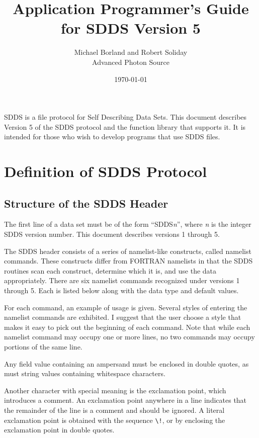 \documentclass[11pt]{article}
\begin{document}
\title{Application Programmer's Guide for SDDS Version 5}
\author{Michael Borland and Robert Soliday\\Advanced Photon Source\\ \date{\today}}
\maketitle

SDDS is a file protocol for Self Describing Data Sets. This document describes Version 5 of the SDDS protocol and the function library that supports it. It is intended for those who wish to develop programs that use SDDS files.

\section{Definition of SDDS Protocol}

\subsection{Structure of the SDDS Header}
\label{sect:header}

The first line of a data set must be of the form ``SDDS{\em n}'', where {\em n} is the integer SDDS version number. This document describes versions 1 through 5.

The SDDS header consists of a series of namelist-like constructs, called namelist commands.  These constructs differ from FORTRAN namelists in that the SDDS routines scan each construct, determine which it is, and use the data appropriately. There are six namelist commands recognized under versions 1 through 5.  Each is listed below along with the data type and default values.

For each command, an example of usage is given.  Several styles of entering the namelist commands are exhibited.  I suggest that the user choose a style that makes it easy to pick out the beginning of each command.  Note that while each namelist command may occupy one or more lines, no two commands may occupy portions of the same line.

Any field value containing an ampersand must be enclosed in double quotes, as must string values containing whitespace characters.

Another character with special meaning is the exclamation point, which introduces a comment.  An exclamation point anywhere in a line indicates that the remainder of the line is a comment and should be ignored.  A literal exclamation point is obtained with the sequence \verb|\!|, or by enclosing the exclamation point in double quotes.
\end{document}
